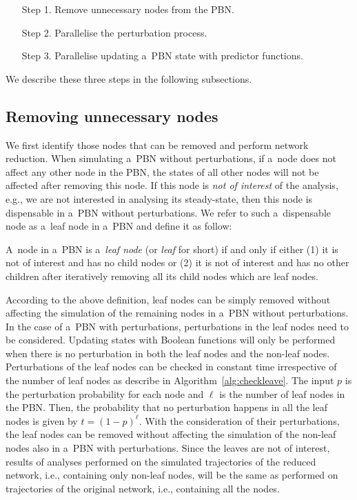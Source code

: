 \documentclass[runningheads,a4paper]{llncs}
\begin{document}
\smallskip
\begin{itemize}[leftmargin=1.0in]
\item[Step 1.] Remove unnecessary nodes from the PBN.
\item[Step 2.] Parallelise the perturbation process.
\item[Step 3.] Parallelise updating a~PBN state with predictor functions.
\end{itemize}
\smallskip
We describe these three steps in the following subsections.

\subsection{Removing unnecessary nodes}
\label{ssec:leaves}
We first identify those nodes that can be removed and perform network reduction.
When simulating a~PBN without perturbations,
if a~node does not affect any other node in the PBN,
the states of all other nodes will not be affected after removing this node.
If this node is \emph{not of interest} of the analysis, e.g., we are not interested in analysing
its steady-state, then this node is dispensable in a~PBN without perturbations.
We refer to such a~dispensable node as a~leaf node in a~PBN and define it as follow:
%
\begin{definition}
A~node in a~PBN is a~\emph{leaf node} (or \emph{leaf} for short) if and only if either (1) it is not of interest and has
no child nodes or (2) it is not of interest and has no other children after iteratively removing all its child nodes
which are leaf nodes.
\end{definition}
%
According to the above definition,
leaf nodes can be simply removed without affecting the simulation of the remaining nodes
in a~PBN without perturbations.
In the case of a~PBN with perturbations,
perturbations in the leaf nodes need to be considered.
Updating states with Boolean functions will only be performed when
there is no perturbation in both the leaf nodes and the non-leaf nodes.
Perturbations of the leaf nodes can be checked in constant time irrespective of the number of leaf
nodes as describe in Algorithm~\ref{alg:checkleave}. The input $p$ is the perturbation probability
for each node and $\ell$ is the number of leaf nodes in the PBN. Then, the probability that no
perturbation happens in all the leaf nodes is given by $t=(1-p)^\ell$.
With the consideration of their perturbations, the leaf nodes can be removed without affecting the
simulation of the non-leaf nodes also in a~PBN with perturbations. Since the leaves are not of
interest, results of analyses performed on the simulated trajectories of the reduced network,
i.e., containing only non-leaf nodes, will be the same as performed on trajectories of the
original network, i.e., containing all the nodes.
\end{document}
